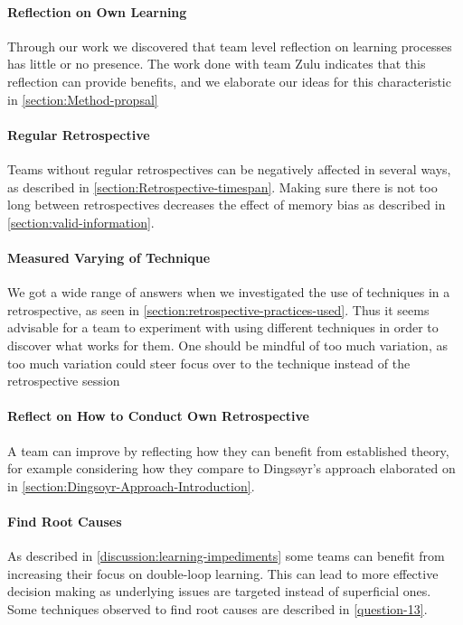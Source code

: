 \paragraph{Reflection on Own Learning}
Through our work we discovered that team level reflection on learning processes has little or no presence. The work done with team Zulu indicates that this reflection can provide benefits, and we elaborate our ideas for this characteristic in \autoref{section:Method-propsal}

\paragraph{Regular Retrospective}
Teams without regular retrospectives can be negatively affected in several ways, as described in \autoref{section:Retrospective-timespan}. Making sure there is not too long between retrospectives decreases the effect of memory bias as described in \autoref{section:valid-information}.

\paragraph{Measured Varying of Technique}
We got a wide range of answers when we investigated the use of techniques in a retrospective, as seen in \autoref{section:retrospective-practices-used}. Thus it seems advisable for a team to experiment with using different techniques in order to discover what works for them. One should be mindful of too much variation, as too much variation could steer focus over to the technique instead of the retrospective session

\paragraph{Reflect on How to Conduct Own Retrospective} %
A team can improve by reflecting how they can benefit from established theory, for example considering how they compare to Dingsøyr's approach elaborated on in \autoref{section:Dingsoyr-Approach-Introduction}.

\paragraph{Find Root Causes}
As described in \autoref{discussion:learning-impediments} some teams can benefit from increasing their focus on double-loop learning. This can lead to more effective decision making as underlying issues are targeted instead of superficial ones. Some techniques observed to find root causes are described in \autoref{question-13}.

